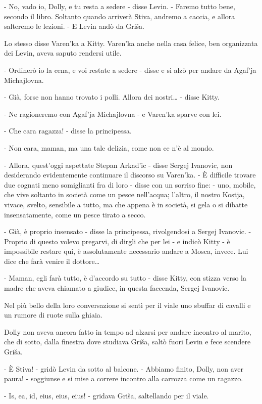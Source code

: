 - No, vado io, Dolly, e tu resta a sedere - disse Levin. - Faremo tutto bene, secondo il libro. Soltanto quando arriverà Stiva, andremo a caccia, e allora salteremo le lezioni. - E Levin andò da Griša. 

Lo stesso disse Varen'ka a Kitty. Varen'ka anche nella casa felice, ben organizzata dei Levin, aveva saputo rendersi utile. 

- Ordinerò io la cena, e voi restate a sedere - disse e si alzò per andare da Agaf'ja Michajlovna. 

- Già, forse non hanno trovato i polli. Allora dei nostri\ldots{} - disse Kitty. 

- Ne ragioneremo con Agaf'ja Michajlovna - e Varen'ka sparve con lei. 

- Che cara ragazza! - disse la principessa. 

- Non cara, maman, ma una tale delizia, come non ce n'è al mondo. 

- Allora, quest'oggi aspettate Stepan Arkad'ic - disse Sergej Ivanovic, non desiderando evidentemente continuare il discorso su Varen'ka. - È difficile trovare due cognati meno somiglianti fra di loro - disse con un sorriso fine: - uno, mobile, che vive soltanto in società come un pesce nell'acqua; l'altro, il nostro Kostja, vivace, svelto, sensibile a tutto, ma che appena è in società, si gela o si dibatte insensatamente, come un pesce tirato a secco. 

- Già, è proprio insensato - disse la principessa, rivolgendosi a Sergej Ivanovic. - Proprio di questo volevo pregarvi, di dirgli che per lei - e indicò Kitty - è impossibile restare qui, è assolutamente necessario andare a Mosca, invece. Lui dice che farà venire il dottore\ldots{} 

- Maman, egli farà tutto, è d'accordo su tutto - disse Kitty, con stizza verso la madre che aveva chiamato a giudice, in questa faccenda, Sergej Ivanovic. 

Nel più bello della loro conversazione si sentì per il viale uno sbuffar di cavalli e un rumore di ruote sulla ghiaia. 

Dolly non aveva ancora fatto in tempo ad alzarsi per andare incontro al marito, che di sotto, dalla finestra dove studiava Griša, saltò fuori Levin e fece scendere Griša. 

- È Stiva! - gridò Levin da sotto al balcone. - Abbiamo finito, Dolly, non aver paura! - soggiunse e si mise a correre incontro alla carrozza come un ragazzo. 

- Is, ea, id, eius, eius, eius! - gridava Griša, saltellando per il viale. 

